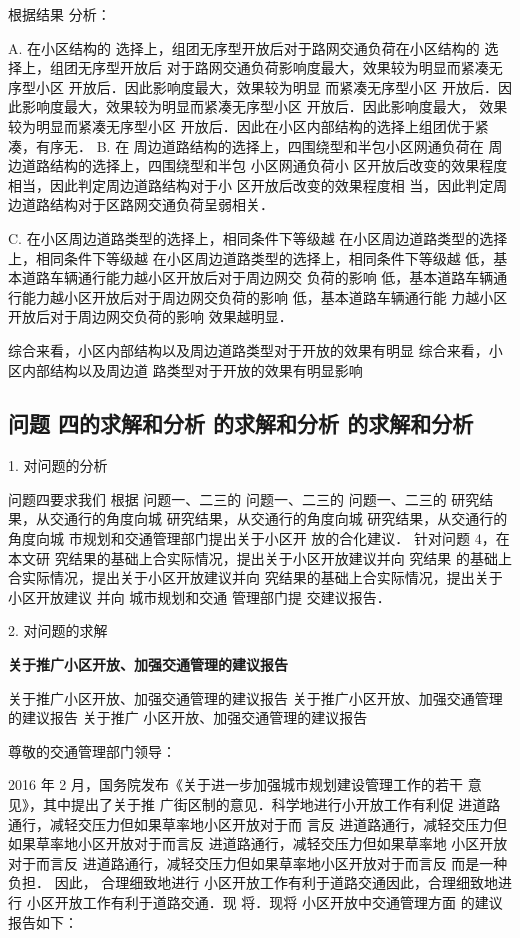 根据结果 分析：

A. 在小区结构的 选择上，组团无序型开放后对于路网交通负荷在小区结构的 选择上，组团无序型开放后
对于路网交通负荷影响度最大，效果较为明显而紧凑无序型小区 开放后．因此影响度最大，效果较为明显
而紧凑无序型小区 开放后．因此影响度最大，效果较为明显而紧凑无序型小区 开放后．因此影响度最大，
效果较为明显而紧凑无序型小区 开放后．因此在小区内部结构的选择上组团优于紧凑，有序无．
B. 在 周边道路结构的选择上，四围绕型和半包小区网通负荷在 周边道路结构的选择上，四围绕型和半包
小区网通负荷小 区开放后改变的效果程度相当，因此判定周边道路结构对于小 区开放后改变的效果程度相
当，因此判定周边道路结构对于区路网交通负荷呈弱相关．

C. 在小区周边道路类型的选择上，相同条件下等级越 在小区周边道路类型的选择上，相同条件下等级越
在小区周边道路类型的选择上，相同条件下等级越 低，基本道路车辆通行能力越小区开放后对于周边网交
负荷的影响 低，基本道路车辆通行能力越小区开放后对于周边网交负荷的影响 低，基本道路车辆通行能
力越小区开放后对于周边网交负荷的影响 效果越明显．

综合来看，小区内部结构以及周边道路类型对于开放的效果有明显 综合来看，小区内部结构以及周边道
路类型对于开放的效果有明显影响

\subsection{问题 四的求解和分析 的求解和分析 的求解和分析}

1. 对问题的分析

问题四要求我们 根据 问题一、二三的 问题一、二三的 问题一、二三的 研究结果，从交通行的角度向城
研究结果，从交通行的角度向城 研究结果，从交通行的角度向城 市规划和交通管理部门提出关于小区开
放的合化建议． 针对问题 4，在本文研 究结果的基础上合实际情况，提出关于小区开放建议并向 究结果
的基础上合实际情况，提出关于小区开放建议并向 究结果的基础上合实际情况，提出关于小区开放建议
并向 城市规划和交通 管理部门提 交建议报告．

2. 对问题的求解

\begin{center}\textbf{关于推广小区开放、加强交通管理的建议报告}\end{center}

 关于推广小区开放、加强交通管理的建议报告 关于推广小区开放、加强交通管理的建议报告 关于推广
 小区开放、加强交通管理的建议报告

尊敬的交通管理部门领导：

2016 年 2 月，国务院发布《关于进一步加强城市规划建设管理工作的若干 意见》，其中提出了关于推
广街区制的意见．科学地进行小开放工作有利促 进道路通行，减轻交压力但如果草率地小区开放对于而
言反 进道路通行，减轻交压力但如果草率地小区开放对于而言反 进道路通行，减轻交压力但如果草率地
小区开放对于而言反 进道路通行，减轻交压力但如果草率地小区开放对于而言反 而是一种负担． 因此，
合理细致地进行 小区开放工作有利于道路交通因此，合理细致地进行 小区开放工作有利于道路交通．现
将．现将 小区开放中交通管理方面 的建议报告如下：

